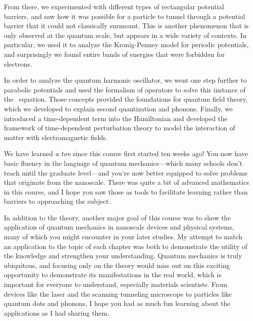 From there, we experimented with different types of rectangular potential barriers, and saw how it was possible for a particle to tunnel through a potential barrier that it could not classically surmount. This is another phenomenon that is only observed at the quantum scale, but appears in a wide variety of contexts. In particular, we used it to analyze the Kronig-Penney model for periodic potentials, and surprisingly we found entire bands of energies that were forbidden for electrons. \par 

In order to analyze the quantum harmonic oscillator, we went one step further to parabolic potentials and used the formalism of operators to solve this instance of the \Sch\ equation. Those concepts provided the foundations for quantum field theory, which we developed to explain second quantization and phonons. Finally, we introduced a time-dependent term into the Hamiltonian and developed the framework of time-dependent perturbation theory to model the interaction of matter with electromagnetic fields. \par 

We have learned \emph{a ton} since this course first started ten weeks ago! You now have basic fluency in the language of quantum mechanics---which many schools don't teach until the graduate level---and you're now better equipped to solve problems that originate from the nanoscale. There was quite a bit of advanced mathematics in this course, and I hope you saw those as tools to facilitate learning rather than barriers to approaching the subject.

In addition to the theory, another major goal of this course was to show the application of quantum mechanics in nanoscale devices and physical systems, many of which you might encounter in your later studies. My attempt to match an application to the topic of each chapter was both to demonstrate the utility of the knowledge and strengthen your understanding. Quantum mechanics is truly ubiquitous, and focusing only on the theory would miss out on this exciting opportunity to demonstrate its manifestations in the real world, which is important for everyone to understand, especially materials scientists. From devices like the laser and the scanning tunneling microscope to particles like quantum dots and phonons, I hope you had as much fun learning about the applications as I had sharing them.


